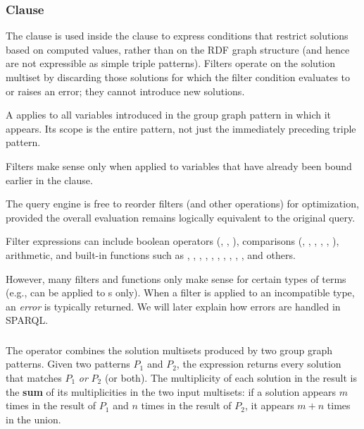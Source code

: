 \subsubsection{ Clause}
The  clause is used inside the  clause to express conditions that restrict solutions based on computed values, rather than on the RDF graph structure (and hence are not expressible as simple triple patterns). Filters operate on the solution multiset by discarding those solutions for which the filter condition evaluates to  or raises an error; they cannot introduce new solutions.

A  applies to all variables introduced in the group graph pattern in which it appears. Its scope is the entire pattern, not just the immediately preceding triple pattern.
    
Filters make sense only when applied to variables that have already been bound earlier in the  clause.

\begin{note}{}
    The query engine is free to reorder filters (and other operations) for optimization, provided the overall evaluation remains logically equivalent to the original query.
\end{note}

Filter expressions can include boolean operators (\code{!}, \code{\&\&}, \code{||}), comparisons (\code{=}, \code{!=}, \code{<}, \code{>}, \code{<=}, \code{>=}), arithmetic, and built-in functions such as , , , , , , , , , , and others.

However, many filters and functions only make sense for certain types of terms (e.g.,  can be applied to s only).
When a filter is applied to an incompatible type, an \emph{error} is typically returned. 
We will later explain how errors are handled in SPARQL.

\subsubsection{}

The  operator combines the solution multisets produced by two group graph patterns. 
Given two patterns \(P_1\) and \(P_2\), the expression  returns every solution that matches \(P_1\) \emph{or} \(P_2\) (or both). 
The multiplicity of each solution in the result is the \textbf{sum} of its multiplicities in the two input multisets: if a solution appears \(m\) times in the result of \(P_1\) and \(n\) times in the result of \(P_2\), it appears \(m + n\) times in the union.

